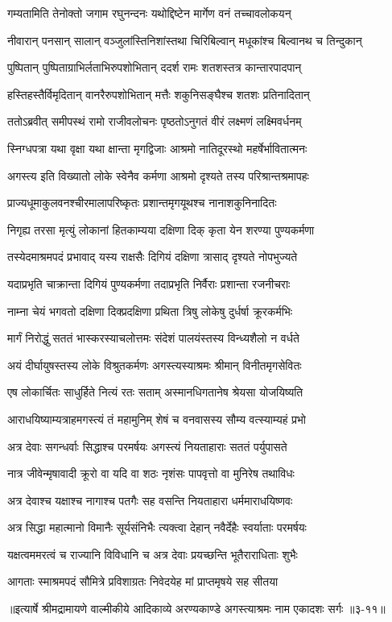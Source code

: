 \twolineshloka
{गम्यतामिति तेनोक्तो जगाम रघुनन्दनः}
{यथोद्दिष्टेन मार्गेण वनं तच्चावलोकयन्} %

\twolineshloka
{नीवारान् पनसान् सालान् वञ्जुलांस्तिनिशांस्तथा}
{चिरिबिल्वान् मधूकांश्च बिल्वानथ च तिन्दुकान्} %

\twolineshloka
{पुष्पितान् पुष्पिताग्राभिर्लताभिरुपशोभितान्}
{ददर्श रामः शतशस्तत्र कान्तारपादपान्} %

\twolineshloka
{हस्तिहस्तैर्विमृदितान् वानरैरुपशोभितान्}
{मत्तैः शकुनिसङ्घैश्च शतशः प्रतिनादितान्} %

\twolineshloka
{ततोऽब्रवीत् समीपस्थं रामो राजीवलोचनः}
{पृष्ठतोऽनुगतं वीरं लक्ष्मणं लक्ष्मिवर्धनम्} %

\twolineshloka
{स्निग्धपत्रा यथा वृक्षा यथा क्षान्ता मृगद्विजाः}
{आश्रमो नातिदूरस्थो महर्षेर्भावितात्मनः} %

\twolineshloka
{अगस्त्य इति विख्यातो लोके स्वेनैव कर्मणा}
{आश्रमो दृश्यते तस्य परिश्रान्तश्रमापहः} %

\twolineshloka
{प्राज्यधूमाकुलवनश्चीरमालापरिष्कृतः}
{प्रशान्तमृगयूथश्च नानाशकुनिनादितः} %

\twolineshloka
{निगृह्य तरसा मृत्युं लोकानां हितकाम्यया}
{दक्षिणा दिक् कृता येन शरण्या पुण्यकर्मणा} %

\twolineshloka
{तस्येदमाश्रमपदं प्रभावाद् यस्य राक्षसैः}
{दिगियं दक्षिणा त्रासाद् दृश्यते नोपभुज्यते} %

\twolineshloka
{यदाप्रभृति चाक्रान्ता दिगियं पुण्यकर्मणा}
{तदाप्रभृति निर्वैराः प्रशान्ता रजनीचराः} %

\twolineshloka
{नाम्ना चेयं भगवतो दक्षिणा दिक्प्रदक्षिणा}
{प्रथिता त्रिषु लोकेषु दुर्धर्षा क्रूरकर्मभिः} %

\twolineshloka
{मार्गं निरोद्धुं सततं भास्करस्याचलोत्तमः}
{संदेशं पालयंस्तस्य विन्ध्यशैलो न वर्धते} %

\twolineshloka
{अयं दीर्घायुषस्तस्य लोके विश्रुतकर्मणः}
{अगस्त्यस्याश्रमः श्रीमान् विनीतमृगसेवितः} %

\twolineshloka
{एष लोकार्चितः साधुर्हिते नित्यं रतः सताम्}
{अस्मानधिगतानेष श्रेयसा योजयिष्यति} %

\twolineshloka
{आराधयिष्याम्यत्राहमगस्त्यं तं महामुनिम्}
{शेषं च वनवासस्य सौम्य वत्स्याम्यहं प्रभो} %

\twolineshloka
{अत्र देवाः सगन्धर्वाः सिद्धाश्च परमर्षयः}
{अगस्त्यं नियताहाराः सततं पर्युपासते} %

\twolineshloka
{नात्र जीवेन्मृषावादी क्रूरो वा यदि वा शठः}
{नृशंसः पापवृत्तो वा मुनिरेष तथाविधः} %

\twolineshloka
{अत्र देवाश्च यक्षाश्च नागाश्च पतगैः सह}
{वसन्ति नियताहारा धर्ममाराधयिष्णवः} %

\twolineshloka
{अत्र सिद्धा महात्मानो विमानैः सूर्यसंनिभैः}
{त्यक्त्वा देहान् नवैर्देहैः स्वर्याताः परमर्षयः} %

\twolineshloka
{यक्षत्वममरत्वं च राज्यानि विविधानि च}
{अत्र देवाः प्रयच्छन्ति भूतैराराधिताः शुभैः} %

\twolineshloka
{आगताः स्माश्रमपदं सौमित्रे प्रविशाग्रतः}
{निवेदयेह मां प्राप्तमृषये सह सीतया} %


॥इत्यार्षे श्रीमद्रामायणे वाल्मीकीये आदिकाव्ये अरण्यकाण्डे अगस्त्याश्रमः नाम एकादशः सर्गः ॥३-११॥
